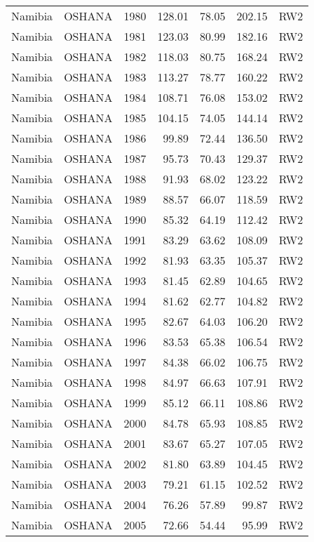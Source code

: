 \begin{longtable}{lllrrrl}
  Namibia & OSHANA & 1980 & 128.01 & 78.05 & 202.15 & RW2 \\ 
  Namibia & OSHANA & 1981 & 123.03 & 80.99 & 182.16 & RW2 \\ 
  Namibia & OSHANA & 1982 & 118.03 & 80.75 & 168.24 & RW2 \\ 
  Namibia & OSHANA & 1983 & 113.27 & 78.77 & 160.22 & RW2 \\ 
  Namibia & OSHANA & 1984 & 108.71 & 76.08 & 153.02 & RW2 \\ 
  Namibia & OSHANA & 1985 & 104.15 & 74.05 & 144.14 & RW2 \\ 
  Namibia & OSHANA & 1986 & 99.89 & 72.44 & 136.50 & RW2 \\ 
  Namibia & OSHANA & 1987 & 95.73 & 70.43 & 129.37 & RW2 \\ 
  Namibia & OSHANA & 1988 & 91.93 & 68.02 & 123.22 & RW2 \\ 
  Namibia & OSHANA & 1989 & 88.57 & 66.07 & 118.59 & RW2 \\ 
  Namibia & OSHANA & 1990 & 85.32 & 64.19 & 112.42 & RW2 \\ 
  Namibia & OSHANA & 1991 & 83.29 & 63.62 & 108.09 & RW2 \\ 
  Namibia & OSHANA & 1992 & 81.93 & 63.35 & 105.37 & RW2 \\ 
  Namibia & OSHANA & 1993 & 81.45 & 62.89 & 104.65 & RW2 \\ 
  Namibia & OSHANA & 1994 & 81.62 & 62.77 & 104.82 & RW2 \\ 
  Namibia & OSHANA & 1995 & 82.67 & 64.03 & 106.20 & RW2 \\ 
  Namibia & OSHANA & 1996 & 83.53 & 65.38 & 106.54 & RW2 \\ 
  Namibia & OSHANA & 1997 & 84.38 & 66.02 & 106.75 & RW2 \\ 
  Namibia & OSHANA & 1998 & 84.97 & 66.63 & 107.91 & RW2 \\ 
  Namibia & OSHANA & 1999 & 85.12 & 66.11 & 108.86 & RW2 \\ 
  Namibia & OSHANA & 2000 & 84.78 & 65.93 & 108.85 & RW2 \\ 
  Namibia & OSHANA & 2001 & 83.67 & 65.27 & 107.05 & RW2 \\ 
  Namibia & OSHANA & 2002 & 81.80 & 63.89 & 104.45 & RW2 \\ 
  Namibia & OSHANA & 2003 & 79.21 & 61.15 & 102.52 & RW2 \\ 
  Namibia & OSHANA & 2004 & 76.26 & 57.89 & 99.87 & RW2 \\ 
  Namibia & OSHANA & 2005 & 72.66 & 54.44 & 95.99 & RW2 \\ 

\end{longtable}
